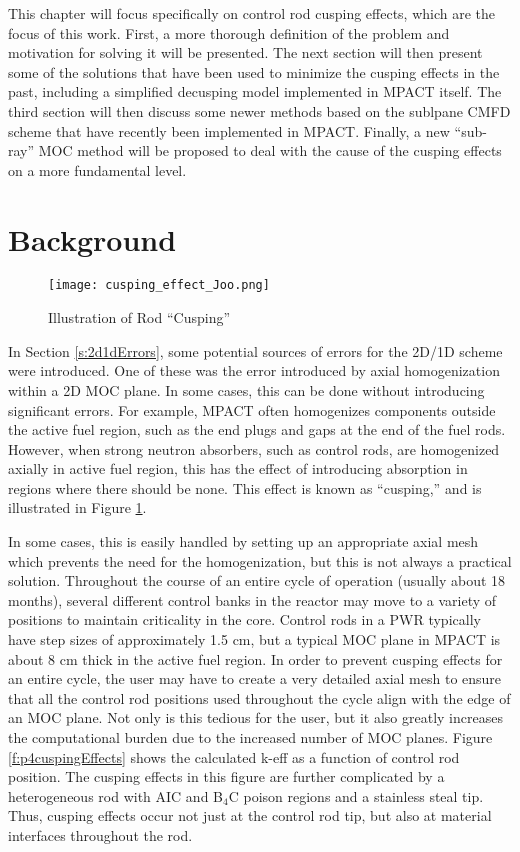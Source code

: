 This chapter will focus specifically on control rod cusping effects, which are the focus of this work.  First, a more thorough definition of the problem and motivation for solving it will be presented.  The next section will then present some of the solutions that have been used to minimize the cusping effects in the past, including a simplified decusping model implemented in MPACT itself.  The third section will then discuss some newer methods based on the sublpane CMFD scheme that have recently been implemented in MPACT.  Finally, a new ``sub-ray'' MOC method will be proposed to deal with the cause of the cusping effects on a more fundamental level.

\section{Background}

\begin{figure}[h]
    \centering
    \texttt{[image: cusping\_effect\_Joo.png]}
    \caption[Rod Cusping Illustration]{Illustration of Rod ``Cusping'' \cite{ICAPPcontrolRodDecuspingNTRACER}}\label{f:cuspingEffectJoo}
\end{figure}

In Section \ref{s:2d1dErrors}, some potential sources of errors for the 2D/1D scheme were introduced.  One of these was the error introduced by axial homogenization within a 2D MOC plane.  In some cases, this can be done without introducing significant errors.  For example, MPACT often homogenizes components outside the active fuel region, such as the end plugs and gaps at the end of the fuel rods.  However, when strong neutron absorbers, such as control rods, are homogenized axially in active fuel region, this has the effect of introducing absorption in regions where there should be none.  This effect is known as ``cusping,'' \cite{finnemann1977RodCuspingOrigMention} and is illustrated in Figure \ref{f:cuspingEffectJoo}.

In some cases, this is easily handled by setting up an appropriate axial mesh which prevents the need for the homogenization, but this is not always a practical solution.  Throughout the course of an entire cycle of operation (usually about 18 months), several different control banks in the reactor may move to a variety of positions to maintain criticality in the core.  Control rods in a PWR typically have step sizes of approximately 1.5 cm, but a typical MOC plane in MPACT is about 8 cm thick in the active fuel region.  In order to prevent cusping effects for an entire cycle, the user may have to create a very detailed axial mesh to ensure that all the control rod positions used throughout the cycle align with the edge of an MOC plane.  Not only is this tedious for the user, but it also greatly increases the computational burden due to the increased number of MOC planes.  Figure \ref{f:p4cuspingEffects} shows the calculated k-eff as a function of control rod position.  The cusping effects in this figure are further complicated by a heterogeneous rod with AIC and B$_4$C poison regions and a stainless steal tip.  Thus, cusping effects occur not just at the control rod tip, but also at material interfaces throughout the rod.

